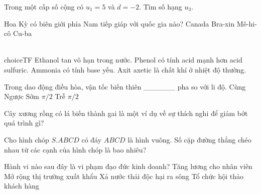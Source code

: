 \begin{ex}
    Trong một cấp số cộng có $u_1 = 5$ và $d = -2$. Tìm số hạng $u_3$.
\end{ex}

\begin{ex}
    Hoa Kỳ có biên giới phía Nam tiếp giáp với quốc gia nào?
    \choice
    {Canada}
    {Bra-xin}
    {\True Mê-hi-cô}
    {Cu-ba}
\end{ex}

\begin{ex}
    \\choiceTF
    {\True Ethanol tan vô hạn trong nước.}
    {Phenol có tính acid mạnh hơn acid sulfuric.}
    {\True Ammonia có tính base yếu.}
    {Axit axetic là chất khí ở nhiệt độ thường.}
\end{ex}

\begin{ex}
    Trong dao động điều hòa, vận tốc biến thiên ______ pha so với li độ.
    \choice
    {Cùng}
    {Ngược}
    {\True Sớm $\pi/2$}
    {Trễ $\pi/2$}
\end{ex}

\begin{ex}
    Cây xương rồng có lá biến thành gai là một ví dụ về sự thích nghi để giảm bớt quá trình gì?

\end{ex}

\begin{ex}
    Cho hình chóp $S.ABCD$ có đáy $ABCD$ là hình vuông. Số cặp đường thẳng chéo nhau từ các cạnh của hình chóp là bao nhiêu?
\end{ex}

\begin{ex}
    Hành vi nào sau đây là vi phạm đạo đức kinh doanh?
    \choice
    {Tăng lương cho nhân viên}
    {Mở rộng thị trường xuất khẩu}
    {\True Xả nước thải độc hại ra sông}
    {Tổ chức hội thảo khách hàng}
\end{ex}

